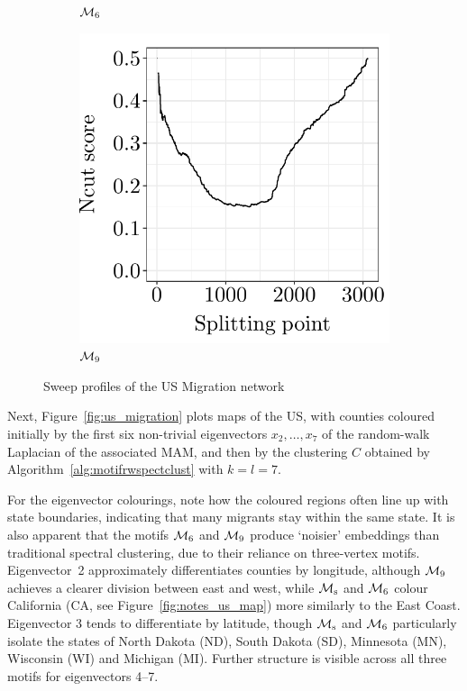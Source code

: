\begin{figure}[H]
\begin{subfigure}{.325\textwidth}
		\caption{$\mathcal{M}_6$}
	\end{subfigure}
	\begin{subfigure}{.325\textwidth}
		\centering
		\includegraphics[scale=0.4,draft=false]{../../results/us_migration/us_migration_sweep_profile_M9.pdf}
		\caption{$\mathcal{M}_9$}
	\end{subfigure}
	\caption{Sweep profiles of the US Migration network}
	\label{fig:migration_sweep}
\end{figure}




Next, Figure~\ref{fig:us_migration} plots maps of the US, with counties coloured initially by the first six non-trivial eigenvectors $x_2, \ldots, x_7$ of the random-walk Laplacian of the associated MAM, and then by the clustering $C$ obtained by Algorithm~\ref{alg:motifrwspectclust} with $k=l=7$.

For the eigenvector colourings, note how the coloured regions often line up with state boundaries, indicating that many migrants stay within the same state.
It is also apparent that the motifs $\mathcal{M}_6$ and $\mathcal{M}_9$ produce `noisier' embeddings than traditional spectral clustering, due to their reliance on three-vertex motifs. 
Eigenvector~2 approximately differentiates counties by longitude, although $\mathcal{M}_9$ achieves a clearer division between east and west, while $\mathcal{M}_\mathrm{s}$ and $\mathcal{M}_6$ colour California (CA, see Figure~\ref{fig:notes_us_map}) more similarly to the East Coast. 
Eigenvector 3 tends to differentiate by latitude, though $\mathcal{M}_\mathrm{s}$ and $\mathcal{M}_6$ particularly isolate the states of North Dakota (ND), South Dakota (SD), Minnesota (MN), Wisconsin (WI) and Michigan (MI).
Further structure is visible across all three motifs for eigenvectors 4--7.

